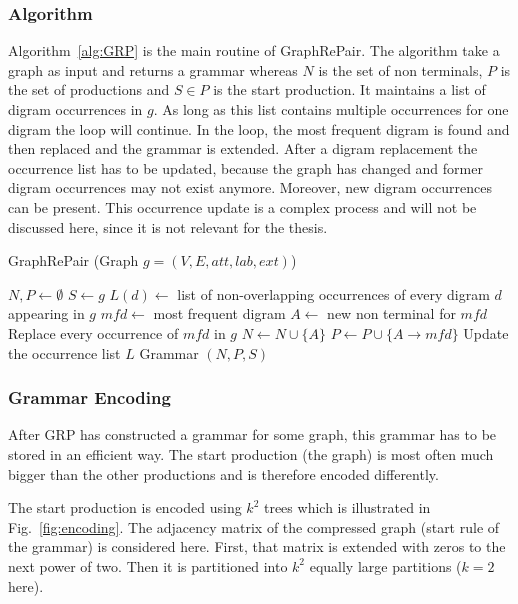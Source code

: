 \subsubsection{Algorithm}

Algorithm~\ref{alg:GRP} is the main routine of GraphRePair. The algorithm take a graph as input and returns a grammar whereas $N$ is the set of non terminals, $P$ is the set of productions and $S \in P$ is the start production. It maintains a list of digram occurrences in $g$. As long as this list contains multiple occurrences for one digram the loop will continue. In the loop, the most frequent digram is found and then replaced and the grammar is extended. After a digram replacement the occurrence list has to be updated, because the graph has changed and former digram occurrences may not exist anymore. Moreover, new digram occurrences can be present. This occurrence update is a complex process and will not be discussed here, since it is not relevant for the thesis.~\cite{maneth}

\begin{algorithm}
	\caption{GraphRePair (Graph $g=(V,E,att,lab,ext)$)}\label{alg:GRP}
	\begin{algorithmic}[1]
		\State $ N,P\leftarrow \emptyset$
		\State $S \leftarrow g$
		\State $L(d) \leftarrow $ list of non-overlapping occurrences of every digram $d$ appearing in $g$
			\State $mfd \leftarrow$ most frequent digram
			\State $A \leftarrow$ new non terminal for $mfd$
			\State Replace every occurrence of $mfd$ in $g$
			\State $N \leftarrow N \cup \{A\}$
			\State $P\leftarrow P\cup \{A \to mfd \}$
			\State Update the occurrence list $L$
		\EndWhile
		\State \Return Grammar $(N,P,S)$
	\end{algorithmic}
\end{algorithm}


\subsubsection{Grammar Encoding}

After GRP has constructed a grammar for some graph, this grammar has to be stored in an efficient way. The start production (the graph) is most often much bigger than the other productions and is therefore encoded differently. 

The start production is encoded using $k^2$ trees which is illustrated in Fig.~\ref{fig:encoding}. The adjacency matrix of the compressed graph (start rule of the grammar) is considered here. First, that matrix is extended with zeros to the next power of two. Then it is partitioned into $k^2$ equally large partitions ($k=2$ here).

